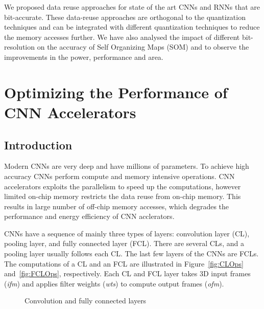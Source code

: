 \documentclass[a4paper,10pt]{article}
\begin{document}
We proposed data reuse approaches for state of the art CNNs and RNNs that are bit-accurate. These data-reuse approaches are orthogonal to the quantization techniques and can be integrated with different quantization techniques to reduce the memory accesses further. We have also analysed the impact of different bit-resolution on the accuracy of Self Organizing Maps (SOM) and to observe the improvements in the power, performance and area. 
\section{Optimizing the Performance of CNN Accelerators}
\subsection{Introduction}
Modern CNNs are very deep and have millions of parameters. To achieve high accuracy CNNs perform compute and memory intensive operations.  CNN accelerators exploits the parallelism to speed up the computations, however limited on-chip memory restricts the data reuse from on-chip memory. This results in large number of off-chip memory accesses, which degrades the performance and energy efficiency of CNN acclerators. 

CNNs have a sequence of mainly three types of layers: convolution layer (CL), pooling layer, and fully connected layer (FCL). There are several CLs, and a pooling layer usually follows each CL. The last few layers of the CNNs are FCLs. The computations of a CL and an FCL are illustrated in Figure~\ref{fig:CLOps} and~\ref{fig:FCLOps}, respectively. Each CL and FCL layer takes 3D input frames (\textit{ifm}) and applies filter weights (\textit{wts}) to compute output frames (\textit{ofm}).
\begin{figure}[!htb]
	\centering
	\hfil	
	\hfil	
	\caption{Convolution and fully connected layers}
	\label{fig:CNNAcceleratorAndCLOps}
	\vspace{-1.0em}	
\end{figure}
\end{document}
